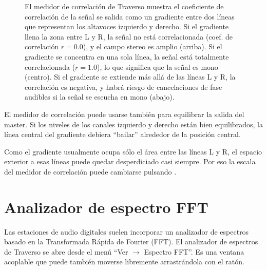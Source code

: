 \begin{figure}
	\centering
	\caption{El medidor de correlación de Traverso muestra el coeficiente de correlación de la señal se salida como un gradiente entre dos líneas que representan los altavoces izquierdo y derecho. Si el gradiente llena la zona entre L y R, la señal no está correlacionada (coef. de correlación $r = 0.0$), y el campo stereo es amplio (arriba). Si el gradiente se concentra en una sola línea, la señal está totalmente correlacionada ($r = 1.0$), lo que significa que la señal es mono (centro). Si el gradiente se extiende más allá de las líneas L y R, la correlación es negativa, y habrá riesgo de cancelaciones de fase audibles si la señal se escucha en mono (abajo).}
	\label{fig_cmeter01}
\end{figure}

El medidor de correlación puede usarse también para equilibrar la salida del master. Si los niveles de los canales izquierdo y derecho están bien equilibrados, la línea central del gradiente debiera ``bailar'' alrededor de la posición central.

Como el gradiente usualmente ocupa sólo el área entre las líneas L y R, el espacio exterior a esas líneas puede quedar desperdiciado casi siempre. Por eso la escala del medidor de correlación puede cambiarse pulsando .

\section{Analizador de espectro FFT}
Las estaciones de audio digitales suelen incorporar un analizador de espectros basado en la Transformada Rápida de Fourier (FFT). El analizador de espectros de Traverso se abre desde el menú ``Ver $\rightarrow$ Espectro FFT''. Es una ventana acoplable que puede también moverse libremente arrastrándola con el ratón.

